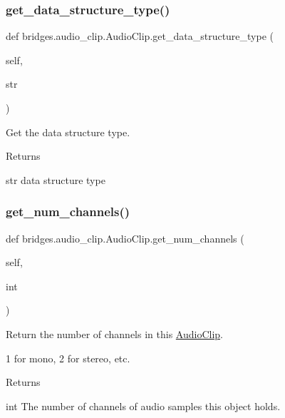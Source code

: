 \subsubsection{\texorpdfstring{get\+\_\+data\+\_\+structure\+\_\+type()}{get\_data\_structure\_type()}}
{\footnotesize\ttfamily def bridges.\+audio\+\_\+clip.\+Audio\+Clip.\+get\+\_\+data\+\_\+structure\+\_\+type (\begin{DoxyParamCaption}\item[{}]{self,  }\item[{}]{str }\end{DoxyParamCaption})}



Get the data structure type. 

\begin{DoxyReturn}{Returns}


str data structure type 
\end{DoxyReturn}
\mbox{\label{classbridges_1_1audio__clip_1_1_audio_clip_af881900e292374fabf1f53a253571e5f}} 
\subsubsection{\texorpdfstring{get\+\_\+num\+\_\+channels()}{get\_num\_channels()}}
{\footnotesize\ttfamily def bridges.\+audio\+\_\+clip.\+Audio\+Clip.\+get\+\_\+num\+\_\+channels (\begin{DoxyParamCaption}\item[{}]{self,  }\item[{}]{int }\end{DoxyParamCaption})}



Return the number of channels in this \hyperlink{classbridges_1_1audio__clip_1_1_audio_clip}{Audio\+Clip}. 

1 for mono, 2 for stereo, etc. \begin{DoxyReturn}{Returns}


int The number of channels of audio samples this object holds. 
\end{DoxyReturn}
\mbox{\label{classbridges_1_1audio__clip_1_1_audio_clip_a6ebead4b2cbd7c5d39c3d67775013ac4}} 
